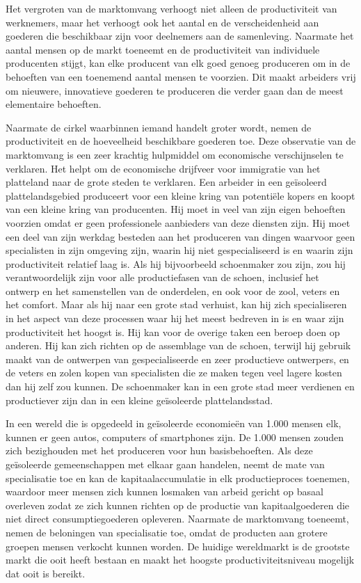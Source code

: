 \documentclass[
  a5paper,
  smalldemyvopaper,11pt,twoside,onecolumn,openright,extrafontsizes,
hidelinks]{memoir}
\begin{document}
Het vergroten van de marktomvang verhoogt niet alleen de productiviteit
van werknemers, maar het verhoogt ook het aantal en de verscheidenheid
aan goederen die beschikbaar zijn voor deelnemers aan de samenleving.
Naarmate het aantal mensen op de markt toeneemt en de productiviteit van
individuele producenten stijgt, kan elke producent van elk goed genoeg
produceren om in de behoeften van een toenemend aantal mensen te
voorzien. Dit maakt arbeiders vrij om nieuwere, innovatieve goederen te
produceren die verder gaan dan de meest elementaire behoeften.

Naarmate de cirkel waarbinnen iemand handelt groter wordt, nemen de
productiviteit en de hoeveelheid beschikbare goederen toe. Deze
observatie van de marktomvang is een zeer krachtig hulpmiddel om
economische verschijnselen te verklaren. Het helpt om de economische
drijfveer voor immigratie van het platteland naar de grote steden te
verklaren. Een arbeider in een geïsoleerd plattelandsgebied produceert
voor een kleine kring van potentiële kopers en koopt van een kleine
kring van producenten. Hij moet in veel van zijn eigen behoeften
voorzien omdat er geen professionele aanbieders van deze diensten zijn.
Hij moet een deel van zijn werkdag besteden aan het produceren van
dingen waarvoor geen specialisten in zijn omgeving zijn, waarin hij niet
gespecialiseerd is en waarin zijn productiviteit relatief laag is. Als
hij bijvoorbeeld schoenmaker zou zijn, zou hij verantwoordelijk zijn
voor alle productiefasen van de schoen, inclusief het ontwerp en het
samenstellen van de onderdelen, en ook voor de zool, veters en het
comfort. Maar als hij naar een grote stad verhuist, kan hij zich
specialiseren in het aspect van deze processen waar hij het meest
bedreven in is en waar zijn productiviteit het hoogst is. Hij kan voor
de overige taken een beroep doen op anderen. Hij kan zich richten op de
assemblage van de schoen, terwijl hij gebruik maakt van de ontwerpen van
gespecialiseerde en zeer productieve ontwerpers, en de veters en zolen
kopen van specialisten die ze maken tegen veel lagere kosten dan hij
zelf zou kunnen. De schoenmaker kan in een grote stad meer verdienen en
productiever zijn dan in een kleine geïsoleerde plattelandsstad.

In een wereld die is opgedeeld in geïsoleerde economieën van 1.000
mensen elk, kunnen er geen autos, computers of smartphones zijn. De
1.000 mensen zouden zich bezighouden met het produceren voor hun
basisbehoeften. Als deze geïsoleerde gemeenschappen met elkaar gaan
handelen, neemt de mate van specialisatie toe en kan de
kapitaalaccumulatie in elk productieproces toenemen, waardoor meer
mensen zich kunnen losmaken van arbeid gericht op basaal overleven zodat
ze zich kunnen richten op de productie van kapitaalgoederen die niet
direct consumptiegoederen opleveren. Naarmate de marktomvang toeneemt,
nemen de beloningen van specialisatie toe, omdat de producten aan
grotere groepen mensen verkocht kunnen worden. De huidige wereldmarkt is
de grootste markt die ooit heeft bestaan en maakt het hoogste
productiviteitsniveau mogelijk dat ooit is bereikt.
\end{document}
